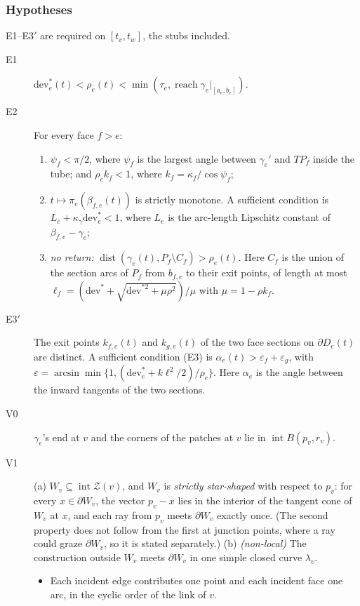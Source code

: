 \documentclass[preprint,12pt]{elsarticle}
\theoremstyle{definition}
\theoremstyle{remark}
\newcommand{\Z}{\mathcal{Z}}
\newcommand{\dist}{\operatorname{dist}}
\newcommand{\inter}{\operatorname{int}}
\begin{document}
\subsubsection*{Hypotheses}
E1--E3$'$ are required on $[t_v,t_w]$, the stubs included.
\begin{description}
\item[E1] $\mathrm{dev}^*_e(t)<\rho_e(t)<\min(\tau_e,\operatorname{reach}\gamma_e|_{[a_e,b_e]})$.
\item[E2] For every face $f>e$:
  \begin{enumerate}
  \item $\psi_f<\pi/2$, where $\psi_f$ is the largest angle between $\gamma_e'$ and $T P_f$ inside the tube;
  and $\rho_e k_f<1$, where $k_f=\kappa_f/\cos\psi_f$;
  \item $t\mapsto\pi_e(\beta_{f,e}(t))$ is strictly monotone. A sufficient condition is $L_e+\kappa_\gamma
  \mathrm{dev}^*_e<1$, where $L_e$ is the arc-length Lipschitz constant of $\beta_{f,e}-\gamma_e$;
  \item \emph{no return:} $\dist(\gamma_e(t),P_f\setminus C_f)>\rho_e(t)$. Here $C_f$ is the union of the section
  arcs of $P_f$ from $b_{f,e}$ to their exit points, of length at most
  $\ell_f=(\mathrm{dev}^*+\sqrt{\mathrm{dev}^{*2}+\mu\rho^2})/\mu$ with $\mu=1-\rho k_f$.
  \end{enumerate}
\item[E3$'$] The exit points $k_{f,e}(t)$ and $k_{g,e}(t)$ of the two face sections on $\partial D_e(t)$ are distinct.
A sufficient condition (E3) is $\alpha_e(t)>\varepsilon_f+\varepsilon_g$, with
$\varepsilon=\arcsin\min\{1,(\mathrm{dev}^*_e+k\ell^2/2)/\rho_e\}$. Here $\alpha_e$ is the angle between the inward
tangents of the two sections.
\item[V0] $\gamma_e$'s end at $v$ and the corners of the patches at $v$ lie in $\inter B(p_v,r_v)$.
\item[V1] (a) $W_v\subseteq\inter\Z(v)$, and $W_v$ is \emph{strictly star-shaped} with respect to $p_v$: for every
$x\in\partial W_v$, the vector $p_v-x$ lies in the interior of the tangent cone of $W_v$ at $x$, and each ray from
$p_v$ meets $\partial W_v$ exactly once. (The second property does not follow from the first at junction points, where a
ray could graze $\partial W_v$, so it is stated separately.)
(b) \emph{(non-local)} The construction outside $W_v$ meets $\partial W_v$ in one simple closed curve $\lambda_v$.
\begin{itemize}
\item Each incident edge contributes one point and each incident face one arc, in the cyclic order of the link of $v$.

\end{itemize}
\end{description}
\end{document}
